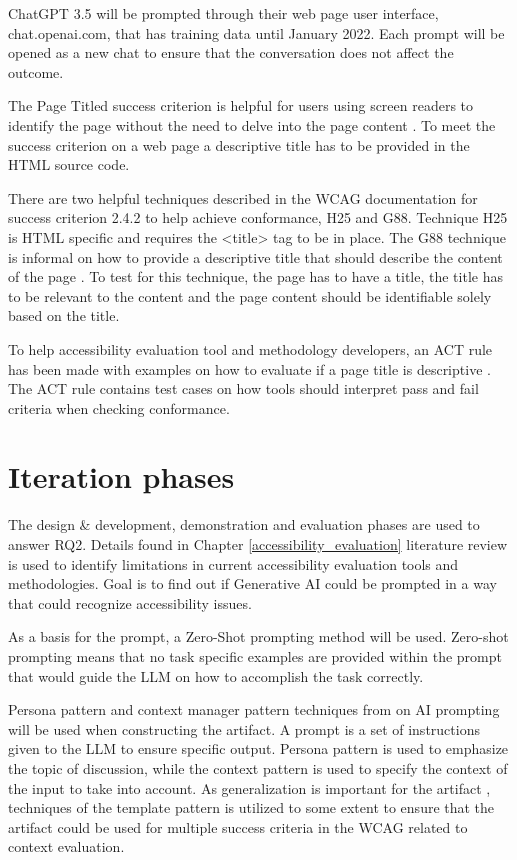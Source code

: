 ChatGPT 3.5 will be prompted through their web page user interface, chat.openai.com, that has training data until January 2022. Each prompt will be opened as a new chat to ensure that the conversation does not affect the outcome. 

The Page Titled success criterion is helpful for users using screen readers to identify the page without the need to delve into the page content \citep{wcag_page_titled}. To meet the success criterion on a web page a descriptive title has to be provided in the HTML source code. 

There are two helpful techniques described in the WCAG documentation for success criterion 2.4.2 to help achieve conformance, H25 and G88. Technique H25 is HTML specific and requires the <title> tag to be in place. The G88 technique is informal on how to provide a descriptive title that should describe the content of the page \citep{g88}. To test for this technique, the page has to have a title, the title has to be relevant to the content and the page content should be identifiable solely based on the title.

To help accessibility evaluation tool and methodology developers, an ACT rule has been made with examples on how to evaluate if a page title is descriptive \citep{act_rule_g88}. The ACT rule contains test cases on how tools should interpret pass and fail criteria when checking conformance. 

\section{Iteration phases}

The design \& development, demonstration and evaluation phases are used to answer RQ2. Details found in Chapter \ref{accessibility_evaluation} literature review is used to identify limitations in current accessibility evaluation tools and methodologies. Goal is to find out if Generative AI could be prompted in a way that could recognize accessibility issues. 

As a basis for the prompt, a Zero-Shot prompting method will be used. Zero-shot prompting means that no task specific examples are provided within the prompt that would guide the LLM on how to accomplish the task correctly.

Persona pattern and context manager pattern techniques from \textcite{white2023prompt} on AI prompting will be used when constructing the artifact. A prompt is a set of instructions given to the LLM to ensure specific output. Persona pattern is used to emphasize the topic of discussion, while the context pattern is used to specify the context of the input to take into account. As generalization is important for the artifact \citep{design_science_eval}, techniques of the template pattern is utilized to some extent to ensure that the artifact could be used for multiple success criteria in the WCAG related to context evaluation.

